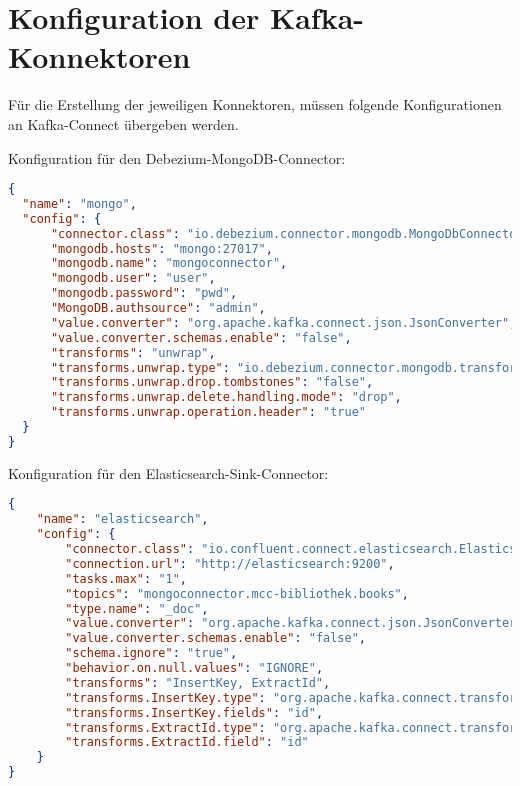 \chapter{Konfiguration der Kafka-Konnektoren}

Für die Erstellung der jeweiligen Konnektoren, müssen folgende Konfigurationen an Kafka-Connect übergeben werden.

Konfiguration für den Debezium-MongoDB-Connector:

\begin{lstlisting}[language=json,firstnumber=1]
{
  "name": "mongo",
  "config": {
      "connector.class": "io.debezium.connector.mongodb.MongoDbConnector",
      "mongodb.hosts": "mongo:27017",
      "mongodb.name": "mongoconnector",
      "mongodb.user": "user",
      "mongodb.password": "pwd",
      "MongoDB.authsource": "admin",
      "value.converter": "org.apache.kafka.connect.json.JsonConverter",
      "value.converter.schemas.enable": "false",
      "transforms": "unwrap",
      "transforms.unwrap.type": "io.debezium.connector.mongodb.transforms.ExtractNewDocumentState",
      "transforms.unwrap.drop.tombstones": "false",
      "transforms.unwrap.delete.handling.mode": "drop",
      "transforms.unwrap.operation.header": "true"
  }
}
\end{lstlisting}

Konfiguration für den Elasticsearch-Sink-Connector:

\begin{lstlisting}[language=json,firstnumber=1]
{
    "name": "elasticsearch",
    "config": {
        "connector.class": "io.confluent.connect.elasticsearch.ElasticsearchSinkConnector",
        "connection.url": "http://elasticsearch:9200",
        "tasks.max": "1",
        "topics": "mongoconnector.mcc-bibliothek.books",
        "type.name": "_doc",
        "value.converter": "org.apache.kafka.connect.json.JsonConverter",
        "value.converter.schemas.enable": "false",
        "schema.ignore": "true",
        "behavior.on.null.values": "IGNORE",
        "transforms": "InsertKey, ExtractId",
        "transforms.InsertKey.type": "org.apache.kafka.connect.transforms.ValueToKey",
        "transforms.InsertKey.fields": "id",
        "transforms.ExtractId.type": "org.apache.kafka.connect.transforms.ExtractField$Key",
        "transforms.ExtractId.field": "id"
    }
}
\end{lstlisting}